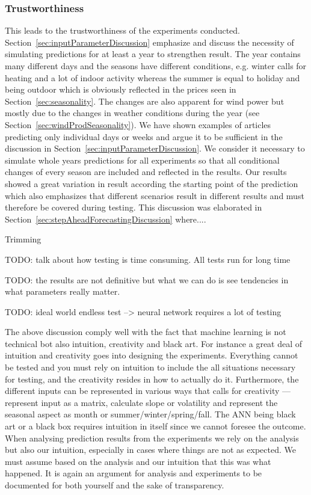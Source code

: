 \subsubsection{Trustworthiness}
This leads to the trustworthiness of the experiments conducted. Section~\ref{sec:inputParameterDiscussion} emphasize and discuss the necessity of simulating predictions for at least a year to strengthen result. The year contains many different days and the seasons have different conditions, e.g. winter calls for heating and a lot of indoor activity whereas the summer is equal to holiday and being outdoor which is obviously reflected in the prices seen in Section~\ref{sec:seasonality}. The changes are also apparent for wind power but mostly due to the changes in weather conditions during the year (see Section~\ref{sec:windProdSeasonality}). We have shown examples of articles predicting only individual days or weeks and argue it to be sufficient in the discussion in Section~\ref{sec:inputParameterDiscussion}. We consider it necessary to simulate whole years predictions for all experiments so that all conditional changes of every season are included and reflected in the results. Our results showed a great variation in result according the starting point of the prediction which also emphasizes that different scenarios result in different results and must therefore be covered during testing. This discussion was elaborated in Section~\ref{sec:stepAheadForecastingDiscussion} where....  

Trimming


TODO: talk about how testing is time consuming. All tests run for long time

TODO: the results are not definitive but what we can do is see tendencies in what parameters really matter.

TODO: ideal world endless test --> neural network requires a lot of testing

The above discussion comply well with the fact that machine learning is not technical bot also intuition, creativity and black art\cite{18}. For instance a great deal of intuition and creativity goes into designing the experiments. Everything cannot be tested and you must rely on intuition to include the all situations necessary for testing, and the creativity resides in how to actually do it. Furthermore, the different inputs can be represented in various ways that calls for creativity --- represent input as a matrix, calculate slope or volatility and represent the seasonal aspect as month or summer/winter/spring/fall. The ANN being black art or a black box requires intuition in itself since we cannot foresee the outcome. When analysing prediction results from the experiments we rely on the analysis but also our intuition, especially in cases where things are not as expected. We must assume based on the analysis and our intuition that this was what happened. It is again an argument for analysis and experiments to be documented for both yourself and the sake of transparency.




